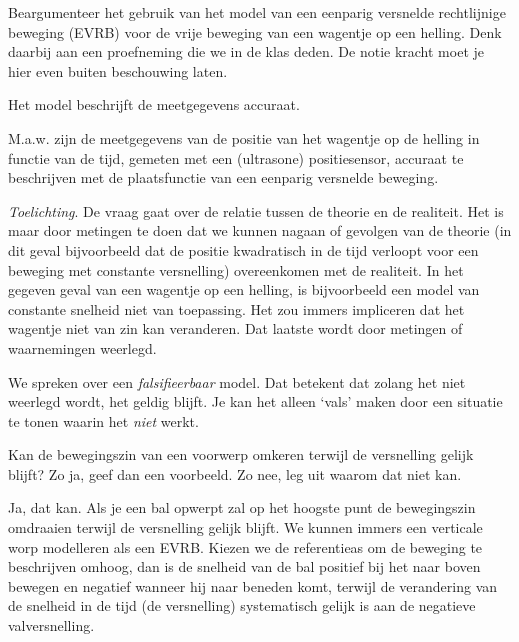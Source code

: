 \documentclass{ximera}
\begin{document}
\begin{exercise}
	Beargumenteer het gebruik van het model van een eenparig versnelde rechtlijnige beweging (EVRB) voor de vrije beweging van een wagentje op een helling. Denk daarbij aan een proefneming die we in de klas deden. De notie kracht moet je hier even buiten beschouwing laten.
	
	\begin{oplossing}
		Het model beschrijft de meetgegevens accuraat.

		M.a.w. zijn de meetgegevens van de positie van het wagentje op de helling in functie van de tijd, gemeten met een (ultrasone) positiesensor, accuraat te beschrijven met de plaatsfunctie van een eenparig versnelde beweging.

		\emph{Toelichting}.
		De vraag gaat over de relatie tussen de theorie en de realiteit. Het is maar door metingen te doen dat we kunnen nagaan of gevolgen van de theorie (in dit geval bijvoorbeeld dat de positie kwadratisch in de tijd verloopt voor een beweging met constante versnelling) overeenkomen met de realiteit. In het gegeven geval van een wagentje op een helling, is bijvoorbeeld een model van constante snelheid niet van toepassing. Het zou immers impliceren dat het wagentje niet van zin kan veranderen. Dat laatste wordt door metingen of waarnemingen weerlegd.

		We spreken over een \textit{falsifieerbaar} model. Dat betekent dat zolang het niet weerlegd wordt, het geldig blijft. Je kan het alleen `vals' maken door een situatie te tonen waarin het \textit{niet} werkt.
	\end{oplossing} 
\end{exercise}


\begin{exercise}
	Kan de bewegingszin van een voorwerp omkeren terwijl de versnelling gelijk blijft? Zo ja, geef dan een voorbeeld. Zo nee, leg uit waarom dat niet kan.
	\begin{oplossing}
		Ja, dat kan. Als je een bal opwerpt zal op het hoogste punt de bewegingszin omdraaien terwijl de versnelling gelijk blijft. We kunnen immers een verticale worp modelleren als een EVRB. Kiezen we de referentieas om de beweging te beschrijven omhoog, dan is de snelheid van de bal positief bij het naar boven bewegen en negatief wanneer hij naar beneden komt, terwijl de verandering van de snelheid in de tijd (de versnelling) systematisch gelijk is aan de negatieve valversnelling.
	\end{oplossing}
\end{exercise}
\end{document}
